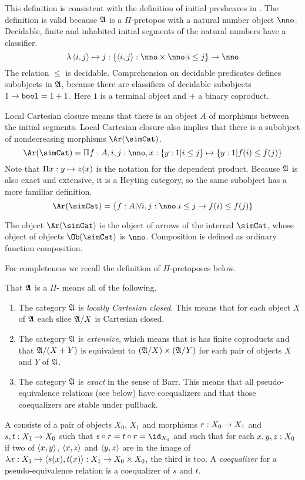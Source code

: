 \documentclass[csh.tex]{subfiles}
\begin{document}
This definition is consistent with the definition of initial presheaves in \citep{MR1300636}. The definition is valid because $\mathfrak A$ is a $\Pi$-pretopos with a natural number object $\nno$. Decidable, finite and inhabited initial segments of the natural numbers have a classifier.
\[  \function{\tuplet{i,j}}j\of\set{\tuplet{i,j}\of\nno\times\nno\middle|i\leq j}\to \nno \]
The relation $\leq$ is decidable. Comprehension on decidable predicates defines subobjects in $\mathfrak A$, because there are classifiers of decidable subobjects $1\to \mathtt{bool} = 1+1$. Here $1$ is a terminal object and $+$ a binary coproduct.

Local Cartesian closure means that there is an object $A$ of morphisms between the initial segments. Local Cartesian closure also implies that there is a subobject of nondecreasing morphisms $\Ar(\simCat)$.
\[ \Ar(\simCat)=\product{f\of A,i,j\of\nno,x\of\set{y\of 1|i\leq j}}{\set{y\of 1|f(i)\leq f(j)}}\]
Note that $\Pi x: y \mapsto z(x)$ is the notation for the dependent product. 
Because $\mathfrak A$ is also exact and extensive, it is a Heyting category, so the same subobject has a more familiar definition.
\[ \Ar(\simCat)=\set{f\of A|\forall i,j\of\nno.i\leq j \to f(i)\leq f(j)} \]

\begin{definition} The object $\Ar(\simCat)$ is the object of arrows of the internal  $\simCat$, whose object of objects $\Ob(\simCat)$ is $\nno$. Composition is defined as ordinary function composition.
\end{definition}

For completeness we recall the definition of $\Pi$-pretoposes below.

\begin{definition} 
That $\mathfrak A$ is a $\Pi$- means all of the following.

\begin{enumerate}
\item The category $\mathfrak A$ is \emph{locally Cartesian closed}. This means that for each object $X$ of $\mathfrak A$ each slice $\mathfrak A/X$ is Cartesian closed.
\item The category $\mathfrak A$ is \emph{extensive}, which means that is has finite coproducts and that $\mathfrak A/(X+Y)$ is equivalent to $(\mathfrak A/X)\times(\mathfrak A/Y)$ for each pair of objects $X$ and $Y$ of $\mathfrak A$.
\item The category $\mathfrak A$ is \emph{exact} in the sense of Barr. This means that all pseudo-equivalence relations (see below) have coequalizers and that those coequalizers are stable under pullback.
\end{enumerate}

A  consists of a pair of objects $X_0$, $X_1$ and morphisms $r: X_0\to X_1$ and $s,t: X_1\to X_0$ such that $s\circ r= t\circ r = \id_{X_0}$ and such that for each $x,y,z: X_0$ if two of $\left\langle x,y \right\rangle$, $\left\langle x,z \right\rangle$ and $\left\langle y,z \right\rangle$ are in the image of $\lambda x: X_1 \mapsto{\left\langle s(x),t(x) \right\rangle}: X_1\to X_0\times X_0$, the third is too. A \emph{coequalizer} for a pseudo-equivalence relation is a coequalizer of $s$ and $t$.
\end{definition}
\end{document}
